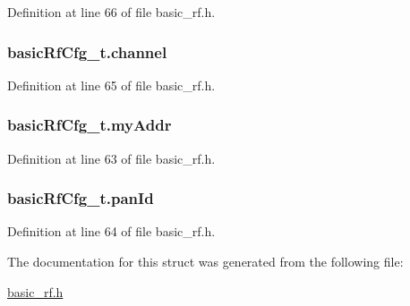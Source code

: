 Definition at line 66 of file basic\_\-rf.h.

\hypertarget{structbasic_rf_cfg__t_a2230c500bdc43d6a102c30ef11d1393d}{
\subsubsection[{channel}]{ {\bf basicRfCfg\_\-t.channel}}}
\label{structbasic_rf_cfg__t_a2230c500bdc43d6a102c30ef11d1393d}


Definition at line 65 of file basic\_\-rf.h.

\hypertarget{structbasic_rf_cfg__t_ae0435b4dbf855970610280ec1697239d}{
\subsubsection[{myAddr}]{ {\bf basicRfCfg\_\-t.myAddr}}}
\label{structbasic_rf_cfg__t_ae0435b4dbf855970610280ec1697239d}


Definition at line 63 of file basic\_\-rf.h.

\hypertarget{structbasic_rf_cfg__t_a198440aa336d6c82fb0341e47d6b5184}{
\subsubsection[{panId}]{ {\bf basicRfCfg\_\-t.panId}}}
\label{structbasic_rf_cfg__t_a198440aa336d6c82fb0341e47d6b5184}


Definition at line 64 of file basic\_\-rf.h.



The documentation for this struct was generated from the following file:\begin{DoxyCompactItemize}
\item 
\hyperlink{basic__rf_8h}{basic\_\-rf.h}\end{DoxyCompactItemize}
